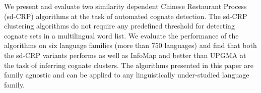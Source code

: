 We present and evaluate two similarity dependent Chinese Restaurant Process (sd-CRP) algorithms at the task of automated cognate detection. The sd-CRP clustering algorithms do not require any predefined threshold for detecting cognate sets in a multilingual word list. We evaluate the performance of the algorithms on six language families (more than 750 languages) and find that both the sd-CRP variants performs as well as InfoMap and better than UPGMA at the task of inferring cognate clusters. The algorithms presented in this paper are family agnostic and can be applied to any linguistically under-studied language family.
